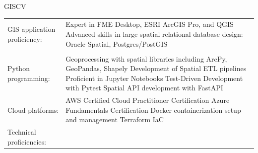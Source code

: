\documentclass[letterpaper]{article}
\newenvironment{skillslist}
        {
            \hspace*{-0.07in}\begin{tabular}[t]{ l L{5.17in} }
        }{
            \end{tabular}
        }
\begin{document}
    \begin{taggedblock}{GISCV}
        \begin{skillslist}
            GIS application proficiency:&
                Expert in FME Desktop, ESRI ArcGIS Pro, and QGIS \linebreak
                Advanced skills in large spatial relational database design: Oracle Spatial, Postgres/PostGIS \linebreak
                \\
                \\
            Python programming:&
                Geoprocessing with spatial libraries including ArcPy, GeoPandas, Shapely \linebreak
                Development of Spatial ETL pipelines \linebreak
                Proficient in Jupyter Notebooks \linebreak
                Test-Driven Development with Pytest \linebreak
                Spatial API development with FastAPI \linebreak
                \\
            Cloud platforms:&
                AWS Certified Cloud Practitioner Certification \linebreak
                Azure Fundamentals Certification \linebreak
                Docker containerization setup and management \linebreak
                Terraform IaC \linebreak
                \\
            Technical proficiencies:&

\end{skillslist}
\end{taggedblock}
\end{document}
